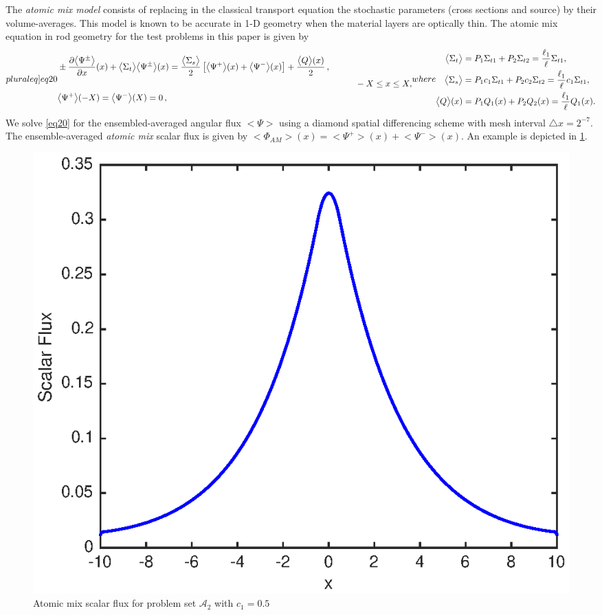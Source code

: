 \documentclass[12pt]{article}
\newcommand{\bl}{\big<}
\newcommand{\bg}{\big>}
\newcommand{\seta}{\mathcal{A}}
\begin{document}
{The {\em atomic mix model} \cite{pom91,dum00} consists of replacing in the classical transport equation the stochastic parameters (cross sections and source) by their volume-averages.
This model is known to be accurate in 1-D geometry when the material layers are optically thin.
The atomic mix equation in rod geometry for the test problems in this paper is given by
\begin{subequations}\label[pluraleq]{eq20}
\begin{align}\label{eq19a}
&\pm \frac{\partial \bl\Psi^{\pm}\bg}{\partial x}(x) + \bl\Sigma_t\bg\bl\Psi^{\pm}\bg(x) 
= \frac{\bl\Sigma_s\bg}{2}\left[\bl\Psi^{+}\bg(x)+\bl\Psi^{-}\bg(x)\right]+ \frac{\bl Q\bg(x)}{2}\,,\\
& \hspace{12cm} -X\leq x\leq X,\nonumber\\
&\bl\Psi^+\bg(-X) = \bl\Psi^-\bg(X) = 0\,,
\end{align}
where 
\begin{align}
\bl\Sigma_t\bg &= P_1\Sigma_{t1} + P_2\Sigma_{t2} = \frac{\ell_1}{\ell}\Sigma_{t1},\\
\bl\Sigma_s\bg &= P_1c_1\Sigma_{t1} + P_2c_2\Sigma_{t2} = \frac{\ell_1}{\ell}c_1\Sigma_{t1},\\
\bl Q\bg(x) &= P_1 Q_1(x) + P_2 Q_2(x) = \frac{\ell_1}{\ell}Q_1(x). \label{eq20e}
\end{align}
\end{subequations}
We solve \cref{eq20} for the ensembled-averaged angular flux $\bl\Psi\bg$ using a diamond spatial differencing scheme with mesh interval $\triangle x=2^{-7}$.
The ensemble-averaged {\em atomic mix} scalar flux is given by $\bl\Phi_{AM}\bg(x) = \bl\Psi^+\bg(x)+\bl\Psi^-\bg(x)$. An example is depicted in \cref{fig5}.
\begin{figure}[htb]
  \centering
  \includegraphics[scale=1]{fig5.eps}
  \caption{Atomic mix scalar flux for problem set {$\seta_2$} with $c_1=0.5$}
  \label{fig5}
\end{figure}

}
\end{document}
